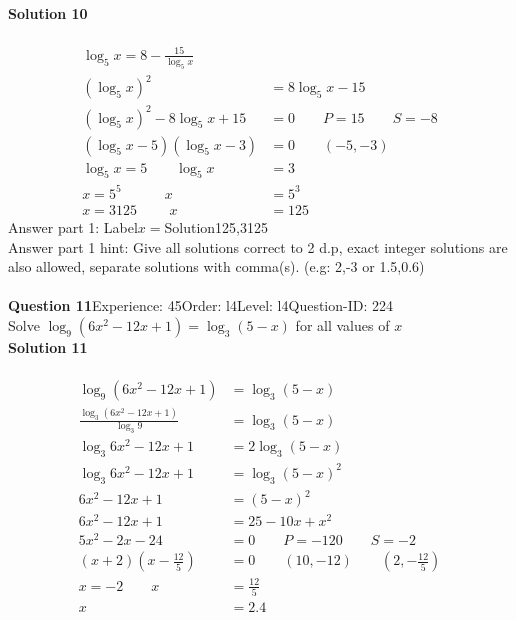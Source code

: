 \documentclass{article}
\begin{document}
\noindent\textbf{Solution 10}\\[2pt]
\\[-35pt]\begin{align*}
\log_{5}x=8-\displaystyle\frac{15}{\log_5{x}}\\[2pt]
(\log_{5}x)^2&=8\log_{5}x-15\\[2pt]
(\log_{5}x)^2-8\log_{5}x+15&=0\qquad P=15 \qquad S=-8\\[2pt]
(\log_{5}x-5)(\log_{5}x-3)&=0\qquad (-5,-3)\\[2pt]
\log_{5}x=5\qquad\log_{5}x&=3\\[2pt]
x=5^5\hspace{37pt} x&=5^3\\[2pt]
x=3125\hspace{28pt}x&=125
\end{align*}
Answer part 1: \hspace{10pt}Label\hspace{10pt}$x=$\hspace{10pt}Solution\hspace{10pt}125,3125\\
Answer part 1 hint: \hspace{15pt} Give all solutions correct to 2 d.p, exact integer solutions are also allowed, separate solutions with comma(s). (e.g: 2,-3 or 1.5,0.6)\\
\\[4pt]
\noindent\textbf{Question 11}\hspace{20pt}Experience: 45\hspace{20pt}Order: l4\hspace{20pt}Level: l4\hspace{20pt}Question-ID: 224\\[2pt]
Solve $\log_{9}(6x^2-12x+1)=\log_{3}(5-x)$ for all values of $x$\\[4pt]
\noindent\textbf{Solution 11}\\[2pt]
\\[-35pt]\begin{align*}
\log_{9}(6x^2-12x+1)&=\log_{3}(5-x)\\[2pt]
\displaystyle\frac{\log_{3}(6x^2-12x+1)}{\log_{3}9}&=\log_{3}(5-x)\\[2pt]
\log_{3}6x^2-12x+1&=2\log_{3}(5-x)\\[2pt]
\log_{3}6x^2-12x+1&=\log_{3}(5-x)^2\\[2pt]
6x^2-12x+1&=(5-x)^2\\[2pt]
6x^2-12x+1&=25-10x+x^2\\[2pt]
5x^2-2x-24&=0\qquad P=-120 \qquad S=-2\\[2pt]
(x+2)\left(x-\displaystyle\frac{12}{5}\right)&=0\qquad (10,-12) \qquad \left(2,-\displaystyle\frac{12}{5}\right)\\[2pt]
x=-2\qquad x&=\displaystyle\frac{12}{5}\\[2pt]
x&=2.4
\end{align*}
\end{document}

